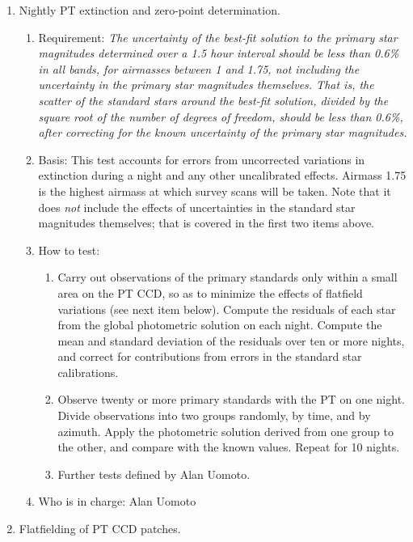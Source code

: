 \begin{enumerate}
\item Nightly PT extinction and zero-point determination.
   \begin{enumerate}
   \item Requirement: {\it The uncertainty of the best-fit
solution to the primary star magnitudes determined over a 1.5 hour
interval should be less than 0.6\% in all 
bands, for airmasses between 1 and 1.75, not including the uncertainty
in the primary star magnitudes themselves.  That is, the scatter of
the standard stars around the best-fit solution, divided by the square
root of the number
of degrees of freedom, should be less than 0.6\%, after correcting for
the known uncertainty of the primary star magnitudes.}
   \item Basis: This test accounts for errors from uncorrected variations
	in extinction during a night and any other uncalibrated
	effects.  Airmass 1.75 is the highest airmass at which survey
	scans will be taken. Note that it does {\em not} include the effects of
	uncertainties in the standard star magnitudes themselves; that
	is covered in the first two items above. 
   \item How to test:
	\begin{enumerate}
	\item Carry out observations of the primary standards only within
	   a small area on the PT CCD, so as to minimize the effects
	   of flatfield variations (see next item below). 
	   Compute the residuals of each star from the global photometric solution
	   on each night.  Compute the mean and standard deviation of
	   the residuals over ten or more nights, and correct for
	   contributions from errors in the standard star calibrations.
	\item Observe twenty or more primary standards with the PT on
	   one night.  Divide observations into two groups randomly, by
	   time, and by azimuth. Apply the photometric solution
	   derived from one group to the other, and compare with the
	   known values. 
	   Repeat for 10 nights. 
	\item Further tests defined by Alan Uomoto. 
	\end{enumerate}

   \item Who is in charge: Alan Uomoto
   \end{enumerate}

\item Flatfielding of PT CCD patches.


\end{enumerate}
